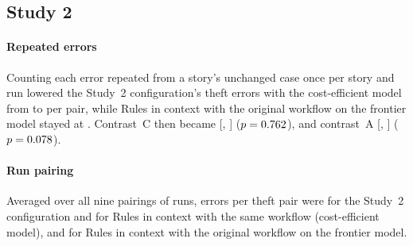 \subsection{Study 2}
\label{app:rob-study2}

\paragraph{Repeated errors}
Counting each error repeated from a story's unchanged case once per story and run lowered the Study~2 configuration's theft errors with the cost-efficient model from \stThCPvTwoLunaErrors{} to \stThCPvTwoLunaErrorsDedup{} per pair, while Rules in context with the original workflow on the frontier model stayed at \stThRTerraErrorsDedup. Contrast~C then became \stSecCDedupDiff{} [\stSecCDedupLo, \stSecCDedupHi] ($p=0.762$), and contrast~A \stSecADedupDiff{} [\stSecADedupLo, \stSecADedupHi] ($p=0.078$).

\paragraph{Run pairing}
Averaged over all nine pairings of runs, errors per theft pair were \stThCPvTwoLunaErrorsAllPair{} for the Study~2 configuration and \stThRVTwoLunaErrorsAllPair{} for Rules in context with the same workflow (cost-efficient model), and \stThRTerraErrorsAllPair{} for Rules in context with the original workflow on the frontier model.
